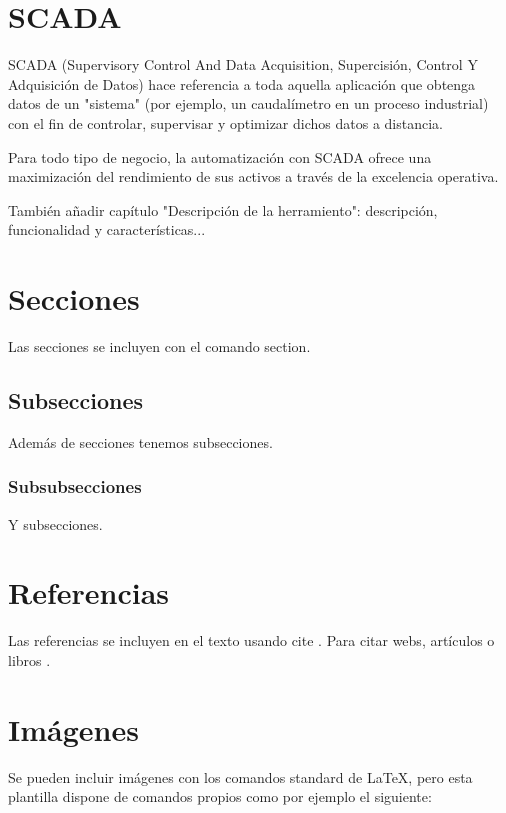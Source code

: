 \section{SCADA}

SCADA (Supervisory Control And Data Acquisition, Supercisión, Control Y Adquisición de Datos) hace referencia a toda aquella aplicación que obtenga datos de un "sistema" (por ejemplo, un caudalímetro en un proceso industrial) con el fin de controlar, supervisar y optimizar dichos datos a distancia.

Para todo tipo de negocio, la automatización con SCADA ofrece una maximización del rendimiento de sus activos a través de la excelencia operativa.


También añadir capítulo "Descripción de la herramiento": descripción, funcionalidad y características...

\section{Secciones}

Las secciones se incluyen con el comando section.

\subsection{Subsecciones}

Además de secciones tenemos subsecciones.

\subsubsection{Subsubsecciones}

Y subsecciones. 


\section{Referencias}

Las referencias se incluyen en el texto usando cite \cite{wiki:latex}. Para citar webs, artículos o libros \cite{koza92}.


\section{Imágenes}

Se pueden incluir imágenes con los comandos standard de \LaTeX, pero esta plantilla dispone de comandos propios como por ejemplo el siguiente:

